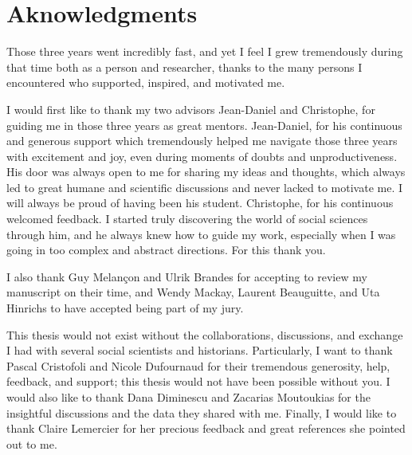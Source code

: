 \chapter*{Aknowledgments}

Those three years went incredibly fast, and yet I feel I grew tremendously during that time both as a person and researcher, thanks to the many persons I encountered  who supported, inspired, and motivated me.

I would first like to thank my two advisors Jean-Daniel and Christophe, for guiding me in those three years as great mentors.
Jean-Daniel, for his continuous and generous support which tremendously helped me navigate those three years with excitement and joy, even during moments of doubts and unproductiveness.
His door was always open to me for sharing my ideas and thoughts, which always led to great humane and scientific discussions and never lacked to motivate me.
I will always be proud of having been his student.
Christophe, for his continuous welcomed feedback.
I started truly discovering the world of social sciences through him, and he always knew how to guide my work, especially when I was going in too complex and abstract directions. For this thank you.

I also thank Guy Melançon and Ulrik Brandes for accepting to review my manuscript on their time, and Wendy Mackay, Laurent Beauguitte, and Uta Hinrichs to have accepted being part of my jury.

This thesis would not exist without the collaborations, discussions, and exchange I had with several social scientists and historians.
Particularly, I want to thank Pascal Cristofoli and Nicole Dufournaud for their tremendous generosity, help, feedback, and support; this thesis would not have been possible without you.
I would also like to thank Dana Diminescu and Zacarias Moutoukias for the insightful discussions and the data they shared with me.
Finally, I would like to thank Claire Lemercier for her precious feedback and great references she pointed out to me.


